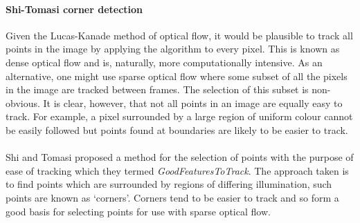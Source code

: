 \paragraph{Shi-Tomasi corner detection}
Given the Lucas-Kanade method of optical flow, it would be plausible to track all points in the image by applying the algorithm to every pixel. This is known as dense optical flow and is, naturally, more computationally 
intensive. As an alternative, one might use sparse optical flow where some subset of all the pixels in the image are tracked between frames. 
The selection of this subset is non-obvious. It is clear, however, that not all points in an image are equally easy to track. For example, a pixel surrounded by a large region of uniform colour cannot be easily followed but points
found at boundaries are likely to be easier to track. 
\\\\
Shi and Tomasi \cite{ShiTomasi} proposed a method for the selection of points with the purpose of ease of tracking which they termed \textit{GoodFeaturesToTrack}. 
The approach taken is to find points which are surrounded by regions of differing illumination, such points are known as `corners'. Corners tend to be easier to track
and so form a good basis for selecting points for use with sparse optical flow.



